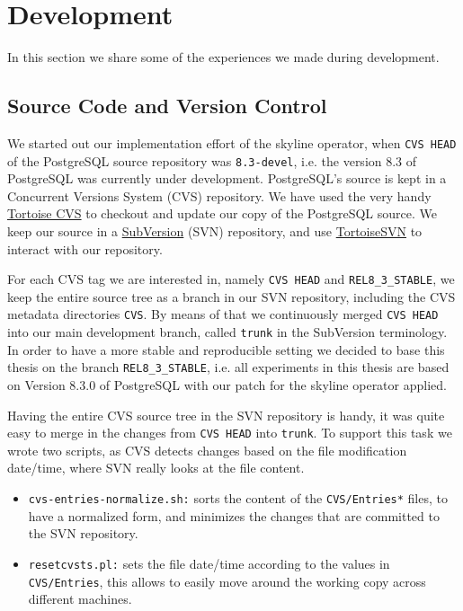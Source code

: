 \section{Development}
In this section we share some of the experiences we made 
during development.

\subsection{Source Code and Version Control}
We started out our implementation effort of the skyline operator, when
\texttt{CVS HEAD} of the PostgreSQL source repository was
\texttt{8.3-devel}, i.e. the version 8.3 of PostgreSQL was currently
under development.  PostgreSQL's source is kept in a Concurrent Versions
System (CVS) repository.  We have used the very handy
\href{http://www.tortoisecvs.org/}{Tortoise CVS} to checkout and
update our copy of the PostgreSQL source.  We keep our source in a
\href{http://subversion.tigris.org/}{SubVersion} (SVN) repository, and use
\href{http://tortoisesvn.tigris.org/}{TortoiseSVN} to interact with our
repository.

For each CVS tag we are interested in, namely \texttt{CVS HEAD} and
\texttt{REL8\_3\_STABLE}, we keep the entire source tree as a branch 
in our SVN repository, including the CVS metadata directories
\texttt{CVS}.  By means of that we continuously merged \texttt{CVS HEAD}
into our main development branch, called \texttt{trunk} in the
SubVersion terminology.  In order to have a more stable and
reproducible setting we decided to base this thesis on the branch
\texttt{REL8\_3\_STABLE}, i.e. all experiments in this thesis are based
on Version 8.3.0 of PostgreSQL with our patch for the skyline
operator applied.

Having the entire CVS source tree in the SVN repository is handy, it
was quite easy to merge in the changes from \texttt{CVS HEAD} into
\texttt{trunk}.  To support this task we wrote two scripts, as CVS
detects changes based on the file modification date/time, where SVN
really looks at the file content.

\begin{itemize}
\item \texttt{cvs-entries-normalize.sh:}
sorts the content of the \texttt{CVS/Entries*} files, to have a
normalized form, and minimizes the changes that are committed to the
SVN repository.

\item \texttt{resetcvsts.pl:}
sets the file date/time according to the values in \texttt{CVS/Entries},
this allows to easily move around the working copy across different machines.
\end{itemize}

